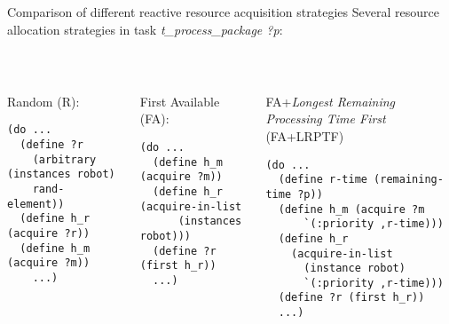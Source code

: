 \begin{frame}[fragile]{Comparison of different reactive resource acquisition strategies}
    Several resource allocation strategies in task \textit{t\_process\_package ?p}:

~~

\pause
    \begin{columns}
    \begin{column}{0.33\textwidth}
        \small
        Random (R):
        \tiny
        \setlength{\leftmargini}{0pt}
        \lstset{columns=fullflexible}
        \begin{lstlisting}
(do ...
  (define ?r 
    (arbitrary (instances robot)
    rand-element))
  (define h_r (acquire ?r))
  (define h_m (acquire ?m))
    ...)
        \end{lstlisting}
    \end{column}

    \pause

    \begin{column}{0.33\textwidth}
        \small
        First Available (FA):
        \tiny
        \setlength{\leftmargini}{0pt}
        \lstset{columns=fullflexible}
        \begin{lstlisting}
(do ...
  (define h_m (acquire ?m))
  (define h_r (acquire-in-list
      (instances robot)))
  (define ?r (first h_r))
  ...)
        \end{lstlisting}   
    \end{column}

    \pause

    \begin{column}{0.33\textwidth}
        \small
        FA+\textit{Longest Remaining Processing Time First} (FA+LRPTF)
        \tiny
        \setlength{\leftmargini}{0pt}
        \lstset{columns=fullflexible}
        \begin{lstlisting}
(do ...
  (define r-time (remaining-time ?p))
  (define h_m (acquire ?m 
      `(:priority ,r-time)))
  (define h_r  
    (acquire-in-list 
      (instance robot)
      `(:priority ,r-time)))
  (define ?r (first h_r))
  ...)
        \end{lstlisting}   
    \end{column}
\end{columns}
\end{frame}




